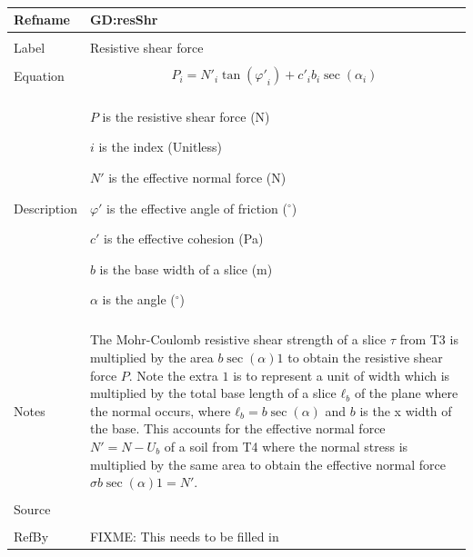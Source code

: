 \documentclass[12pt]{article}
\begin{document}
~\newline
\noindent \begin{minipage}{\textwidth}
\begin{tabular}{p{} p{}}
\toprule \textbf{Refname} & \textbf{GD:resShr}
\label{GD:resShr}
\\ \midrule \\
Label & Resistive shear force
\\ \midrule \\
Equation & \begin{dmath}
           P_{i}={N'}_{i} \tan\left({φ'}_{i}\right)+{c'}_{i} b_{i} \sec\left(α_{i}\right)
           \end{dmath}
\\ \midrule \\
Description & \begin{symbDescription}
              \item{$P$ is the resistive shear force (N)}
              \item{$i$ is the index (Unitless)}
              \item{$N'$ is the effective normal force (N)}
              \item{$φ'$ is the effective angle of friction (${}^{\circ}$)}
              \item{$c'$ is the effective cohesion (Pa)}
              \item{$b$ is the base width of a slice (m)}
              \item{$α$ is the angle (${}^{\circ}$)}
              \end{symbDescription}
\\ \midrule \\
Notes & The Mohr-Coulomb resistive shear strength of a slice $τ$ from T3 is multiplied by the area $b \sec\left(α\right) 1$ to obtain the resistive shear force $P$. Note the extra $1$ is to represent a unit of width which is multiplied by the total base length of a slice ${ℓ_{b}}$ of the plane where the normal occurs, where ${ℓ_{b}}=b \sec\left(α\right)$ and $b$ is the x width of the base. This accounts for the effective normal force $N'=N-{U_{b}}$ of a soil from T4 where the normal stress is multiplied by the same area to obtain the effective normal force $σ b \sec\left(α\right) 1=N'$.
\\ \midrule \\
Source &
\\ \midrule \\
RefBy & FIXME: This needs to be filled in
\\ \bottomrule \end{tabular}
\end{minipage}\\
\end{document}
